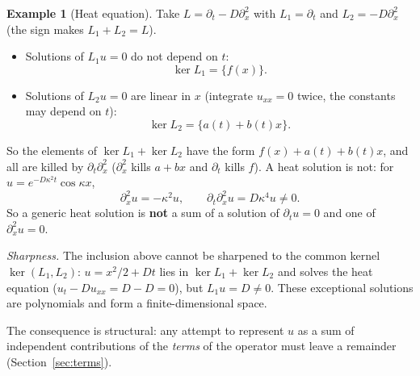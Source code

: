 \documentclass[11pt,a4paper]{article}
\theoremstyle{definition}
\newtheorem{example}{Example}[section]
\begin{document}
\begin{example}[Heat equation]
Take $L=\partial_t-D\partial_x^2$ with $L_1=\partial_t$ and $L_2=-D\partial_x^2$ (the sign makes $L_1+L_2=L$).
\begin{itemize}[nosep]
\item Solutions of $L_1u=0$ do not depend on $t$:
\[\ker L_1=\{f(x)\}.\]
\item Solutions of $L_2u=0$ are linear in $x$ (integrate $u_{xx}=0$ twice, the constants may depend on $t$):
\[\ker L_2=\{a(t)+b(t)x\}.\]
\end{itemize}
So the elements of $\ker L_1+\ker L_2$ have the form $f(x)+a(t)+b(t)x$, and all are killed by $\partial_t\partial_x^2$ ($\partial_x^2$ kills $a+bx$ and $\partial_t$ kills $f$). A heat solution is not: for $u=e^{-D\kappa^2t}\cos\kappa x$,
\[
\partial_x^2u=-\kappa^2u,\qquad \partial_t\partial_x^2u=D\kappa^4u\neq0 .
\]
So a generic heat solution is \textbf{not} a sum of a solution of $\partial_tu=0$ and one of $\partial_x^2u=0$.

\emph{Sharpness.} The inclusion above cannot be sharpened to the common kernel $\ker(L_1,L_2)$: $u=x^2/2+Dt$ lies in $\ker L_1+\ker L_2$ and solves the heat equation ($u_t-Du_{xx}=D-D=0$), but $L_1u=D\neq0$. These exceptional solutions are polynomials and form a finite-dimensional space.
\end{example}
The consequence is structural: any attempt to represent $u$ as a sum of independent contributions of the \emph{terms} of the operator must leave a remainder (Section~\ref{sec:terms}).
\end{document}
